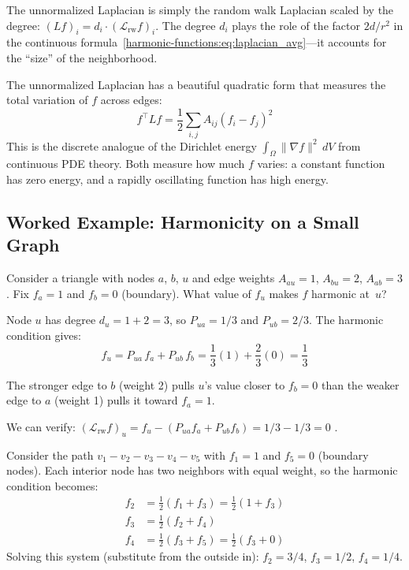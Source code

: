 \begin{notechapter}
The unnormalized Laplacian is simply the random walk Laplacian scaled by the
degree: $(Lf)_i = d_i \cdot (\mathcal{L}_{\mathrm{rw}} f)_i$. The degree
$d_i$ plays the role of the factor $2d/r^2$ in the continuous
formula~\eqref{harmonic-functions:eq:laplacian_avg}---it accounts for the ``size'' of the
neighborhood.

The unnormalized Laplacian has a beautiful quadratic form that measures
the total variation of $f$ across edges:
\begin{equation}
\label{harmonic-functions:eq:laplacian_quadratic}
f^\top L f = \frac{1}{2}\sum_{i,j} A_{ij}(f_i - f_j)^2
\end{equation}
This is the discrete analogue of the Dirichlet energy
$\int_\Omega \|\nabla f\|^2\,dV$ from continuous PDE theory. Both measure
how much $f$ varies: a constant function has zero energy, and a rapidly
oscillating function has high energy.

\subsection{Worked Example: Harmonicity on a Small Graph}

\begin{examplebox}[title=A Weighted Triangle]
Consider a triangle with nodes $a$, $b$, $u$ and edge weights
$A_{au} = 1$, $A_{bu} = 2$, $A_{ab} = 3$. Fix $f_a = 1$ and
$f_b = 0$ (boundary). What value of $f_u$ makes $f$ harmonic at~$u$?

Node $u$ has degree $d_u = 1 + 2 = 3$, so $P_{ua} = 1/3$ and
$P_{ub} = 2/3$. The harmonic condition gives:
\[
f_u = P_{ua}\,f_a + P_{ub}\,f_b = \frac{1}{3}(1) + \frac{2}{3}(0)
= \frac{1}{3}
\]

The stronger edge to $b$ (weight 2) pulls $u$'s value closer to $f_b = 0$
than the weaker edge to $a$ (weight 1) pulls it toward $f_a = 1$.

We can verify: $(\mathcal{L}_{\mathrm{rw}} f)_u = f_u - (P_{ua}f_a +
P_{ub}f_b) = 1/3 - 1/3 = 0$ \checkmark.
\end{examplebox}

\begin{examplebox}[title=The Path Graph (Discrete Rod)]
Consider the path $v_1 - v_2 - v_3 - v_4 - v_5$ with $f_1 = 1$ and
$f_5 = 0$ (boundary nodes). Each interior node has two neighbors with
equal weight, so the harmonic condition becomes:
\begin{align}
f_2 &= \tfrac{1}{2}(f_1 + f_3) = \tfrac{1}{2}(1 + f_3) \\
f_3 &= \tfrac{1}{2}(f_2 + f_4) \\
f_4 &= \tfrac{1}{2}(f_3 + f_5) = \tfrac{1}{2}(f_3 + 0)
\end{align}
Solving this system (substitute from the outside in): $f_2 = 3/4$,
$f_3 = 1/2$, $f_4 = 1/4$.


\end{examplebox}
\end{notechapter}
